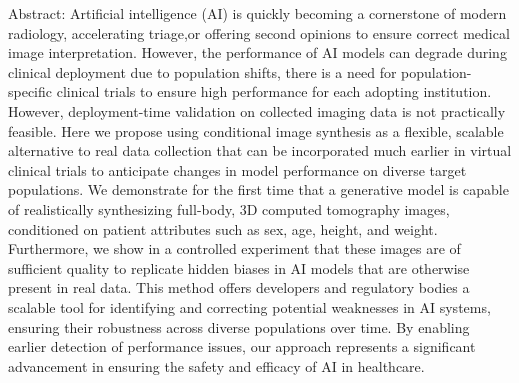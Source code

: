 Abstract:
{
  Artificial intelligence (AI) is quickly becoming a cornerstone of modern radiology, accelerating triage,or offering second opinions to ensure correct medical image interpretation.
  However, the performance of AI models can degrade during clinical deployment due to population shifts, there is a need for population-specific clinical trials to ensure high performance for each adopting institution.
  However, deployment-time validation on collected imaging data is not practically feasible.
  Here we propose using conditional image synthesis as a flexible, scalable alternative to real data collection that can be incorporated much earlier in virtual clinical trials to anticipate changes in model performance on diverse target populations.
  We demonstrate for the first time that a generative model is capable of realistically synthesizing full-body, 3D computed tomography images, conditioned on patient attributes such as sex, age, height, and weight.
  Furthermore, we show in a controlled experiment that these images are of sufficient quality to replicate hidden biases in AI models that are otherwise present in real data.
  This method offers developers and regulatory bodies a scalable tool for identifying and correcting potential weaknesses in AI systems, ensuring their robustness across diverse populations over time.
  By enabling earlier detection of performance issues, our approach represents a significant advancement in ensuring the safety and efficacy of AI in healthcare.
}


